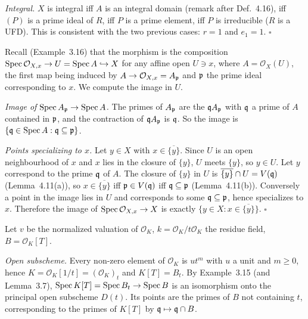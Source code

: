 \documentclass[11pt]{article}
\begin{document}
\emph{Integral.} $X$ is integral iff $A$ is an integral domain (remark after Def.~4.16), iff $(P)$ is a prime ideal of $R$, iff $P$ is a prime element, iff $P$ is irreducible ($R$ is a UFD). This is consistent with the two previous cases: $r=1$ and $e_1=1$. \hfill$\square$

\pf
Recall (Example~3.16) that the morphism is the composition $\operatorname{Spec} \mathcal O_{X,x}\to U=\operatorname{Spec} A\hookrightarrow X$ for any affine open $U\ni x$, where $A=\mathcal O_X(U)$, the first map being induced by $A\to \mathcal O_{X,x}=A_\mathfrak p$ and $\mathfrak p$ the prime ideal corresponding to $x$. We compute the image in $U$.

\emph{Image of $\operatorname{Spec} A_\mathfrak p\to\operatorname{Spec} A$.} The primes of $A_\mathfrak p$ are the $\mathfrak q A_\mathfrak p$ with $\mathfrak q$ a prime of $A$ contained in $\mathfrak p$, and the contraction of $\mathfrak q A_\mathfrak p$ is $\mathfrak q$. So the image is $\{\mathfrak q\in\operatorname{Spec} A:\mathfrak q\subseteq\mathfrak p\}$.

\emph{Points specializing to $x$.} Let $y\in X$ with $x\in\overline{\{y\}}$. Since $U$ is an open neighbourhood of $x$ and $x$ lies in the closure of $\{y\}$, $U$ meets $\{y\}$, so $y\in U$. Let $y$ correspond to the prime $\mathfrak q$ of $A$. The closure of $\{y\}$ in $U$ is $\overline{\{y\}}\cap U=V(\mathfrak q)$ (Lemma~4.11(a)), so $x\in\overline{\{y\}}$ iff $\mathfrak p\in V(\mathfrak q)$ iff $\mathfrak q\subseteq\mathfrak p$ (Lemma~4.11(b)). Conversely a point in the image lies in $U$ and corresponds to some $\mathfrak q\subseteq\mathfrak p$, hence specializes to $x$. Therefore the image of $\operatorname{Spec} \mathcal O_{X,x}\to X$ is exactly $\{y\in X: x\in\overline{\{y\}}\}$. \hfill$\square$

\pf
Let $v$ be the normalized valuation of $\mathcal O_K$, $k=\mathcal O_K/t\mathcal O_K$ the residue field, $B=\mathcal O_K[T]$.

\emph{Open subscheme.} Every non-zero element of $\mathcal O_K$ is $ut^m$ with $u$ a unit and $m\ge0$, hence $K=\mathcal O_K[1/t]=(\mathcal O_K)_t$ and $K[T]=B_t$. By Example~3.15 (and Lemma~3.7), $\operatorname{Spec} K[T]=\operatorname{Spec} B_t\to\operatorname{Spec} B$ is an isomorphism onto the principal open subscheme $D(t)$. Its points are the primes of $B$ not containing $t$, corresponding to the primes of $K[T]$ by $\mathfrak q\mapsto\mathfrak q\cap B$.
\end{document}
